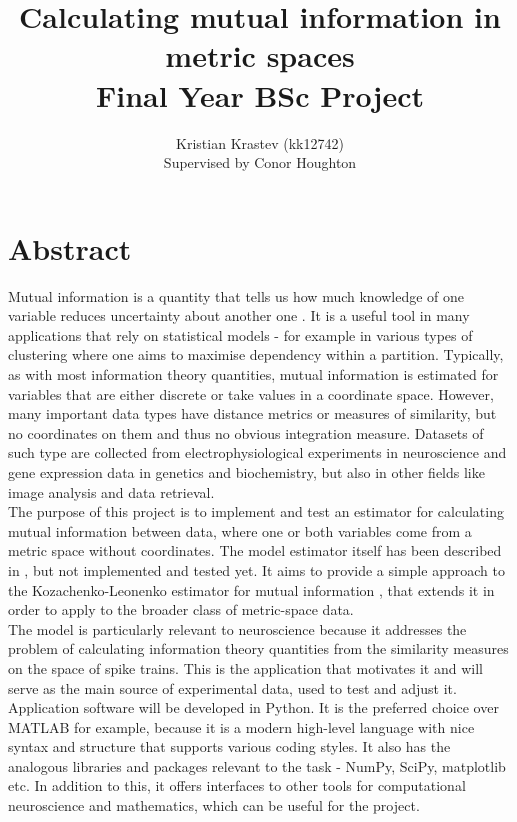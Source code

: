\documentclass[12pt]{extarticle}
\title {\bf Calculating mutual information in metric spaces \\ Final Year BSc Project}
\author{\large Kristian Krastev (kk12742) \\ Supervised by Conor Houghton}
\date{}
\begin{document}
\maketitle
\newpage
\tableofcontents

\newpage
{}
\section*{Abstract}
\noindent
Mutual information is a quantity that tells us how much knowledge of one
variable reduces uncertainty about another one \cite{Thomas, Shannon}. It is a useful tool in many applications that rely on statistical models - for example
in various types of clustering where one aims to maximise dependency within a
partition. Typically, as with most information theory quantities, mutual
information is estimated for variables that are either discrete or take values in a
coordinate space. However, many important data types have distance metrics or
measures of similarity, but no coordinates on them and thus no obvious
integration measure. Datasets of such type are collected from
electrophysiological experiments in neuroscience and gene expression data in 
genetics and biochemistry, but also in other fields like image analysis and data
retrieval.\\

\noindent
The purpose of this project is to implement and test an estimator for
calculating mutual information between data, where one or both variables come
from a metric space without coordinates. The model estimator itself has been
described in \cite{HC14}, but not implemented and tested yet. It aims to
provide a simple approach to the Kozachenko-Leonenko estimator for
mutual information \cite{KL}, that extends it in order to apply to the broader
class of metric-space data.\\

\noindent
The model is particularly relevant to neuroscience because it addresses the
problem of calculating information theory quantities from the similarity
measures on the space of spike trains. This is the application that motivates it
and will serve as the main source of experimental data, used to test and
adjust it.\\

\noindent
Application software will be developed in Python. It is the preferred choice
over MATLAB for example, because it is a modern high-level language with nice
syntax and structure that supports various coding styles. It also has the
analogous libraries and packages relevant to the task - NumPy, SciPy, matplotlib
etc. In addition to this, it offers interfaces to other tools for computational
neuroscience and mathematics, which can be useful for the project.\\
\end{document}
